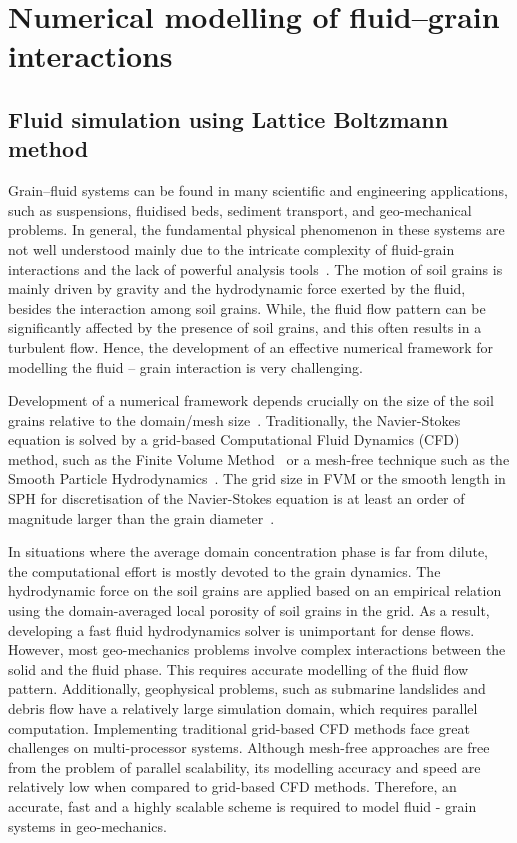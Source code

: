\chapter{Numerical modelling of fluid–grain interactions}

\ifpdf
    \graphicspath{{Chapter5/figs/raster/}{Chapter5/figs/pdf/}{Chapter5/figs/}}
\else
    \graphicspath{{Chapter5/figs/vector/}{Chapter5/figs/}}
\fi


\section{Fluid simulation using Lattice Boltzmann method}

Grain--fluid systems can be found in many scientific and 
engineering applications, such as suspensions, fluidised beds, 
sediment transport, and geo-mechanical problems. In general, 
the fundamental physical phenomenon in these systems are not 
well understood mainly due to the intricate complexity of 
fluid-grain interactions and the lack of powerful analysis 
tools~\citep{Han2007b}. The motion of soil grains is mainly 
driven by gravity and the hydrodynamic force exerted by the 
fluid, besides the interaction among soil grains. While, the 
fluid flow pattern can be significantly affected by the 
presence of soil grains, and this often results in a turbulent 
flow. Hence, the development of an effective numerical 
framework for modelling the fluid -- grain interaction is very challenging.

Development of a numerical framework depends crucially on the 
size of the soil grains relative to the domain/mesh 
size~\citep{Feng2007}. Traditionally, the Navier-Stokes 
equation is solved by a grid-based Computational Fluid Dynamics 
(CFD) method, such as the Finite Volume 
Method~\citep{Capecelatro2013} or a mesh-free technique such as 
the Smooth Particle Hydrodynamics~\citep{Sun2013}. The grid 
size in FVM or the smooth length in SPH for discretisation of 
the Navier-Stokes equation is at least an order of magnitude 
larger than the grain diameter~\citep{Xiong2014}. 

In situations where the average domain concentration phase is 
far from dilute, the computational effort is mostly devoted to 
the grain dynamics. The hydrodynamic force on the soil grains 
are applied based on an empirical relation using the 
domain-averaged local porosity of soil grains in the grid. 
As a result, developing a fast fluid hydrodynamics solver is 
unimportant for dense flows. However, most geo-mechanics 
problems involve complex interactions between the solid and the 
fluid phase. This requires accurate modelling of the 
fluid flow pattern. Additionally, geophysical problems, such as 
submarine landslides and debris flow have a relatively large 
simulation domain, which requires parallel computation. 
Implementing traditional grid-based CFD methods 
face great challenges on multi-processor systems. Although 
mesh-free approaches are free from the problem of parallel 
scalability, its modelling accuracy and speed are relatively 
low when compared to grid-based CFD methods. Therefore, an 
accurate, fast and a highly scalable scheme is required 
to model fluid - grain systems in geo-mechanics. 
 
